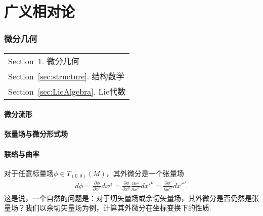 \part{广义相对论}\label{Part:GR}
	\section{微分几何}\label{sec:DG}
		\begin{margintable}\vspace{1.4in}\footnotesize
			\begin{tabularx}{\marginparwidth}{|X}
			Section~\ref{sec:DG}. 微分几何\\
			Section~\ref{sec:structure}. 结构数学\\
			Section~\ref{sec:LieAlgebra}. Lie代数\\
			\end{tabularx}
		\end{margintable}
	\subsection{微分流形}
	
	
	\subsection{张量场与微分形式场}
	
	
	\subsection{联络与曲率}
		对于任意标量场$\phi\in T_{(0,0)}(M)$，其外微分是一个张量场
		\begin{equation}
			\begin{split}
				 d\phi=\frac{\partial\phi}{\partial x^\mu}dx^\mu=\frac{\partial\phi}{\partial {x}^\mu}\frac{\partial{x}^\mu}{\partial {x'}^\nu}d{x'}^\nu=\frac{\partial{\phi'}}{\partial {x'}^\nu}d{x'}^\nu.
			\end{split}
		\end{equation}
		这是说，一个自然的问题是：对于切矢量场或余切矢量场，其外微分是否仍然是张量场？我们以余切矢量场为例，计算其外微分在坐标变换下的性质.
		
